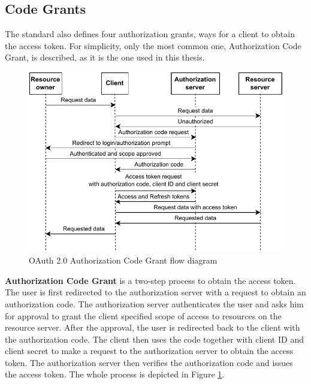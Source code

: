 \subsection*{Code Grants}
\label{section:code_grants}
The standard also defines four authorization grants, ways for a client to obtain the access token. For simplicity, only the most common one, Authorization Code Grant, is described, as it is the one used in this thesis.

\begin{figure}[H]
  \centering
  \includegraphics[width=.8 \linewidth]{figures/auth-sequence-auth-code.pdf}
  \caption{OAuth 2.0 Authorization Code Grant flow diagram}
  \label{fig:oauth2_auth_code_grant}
\end{figure}

\textbf{Authorization Code Grant} is a two-step process to obtain the access token. The user is first redirected to the authorization server with a request to obtain an authorization code. The authorization server authenticates the user and asks him for approval to grant the client specified scope of access to resources on the resource server. After the approval, the user is redirected back to the client with the authorization code. The client then uses the code together with client ID and client secret to make a request to the authorization server to obtain the access token. The authorization server then verifies the authorization code and issues the access token. The whole process is depicted in Figure \ref{fig:oauth2_auth_code_grant}.

